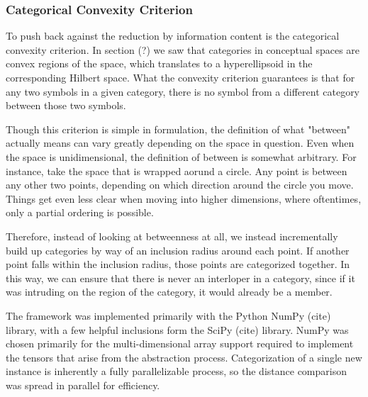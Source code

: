 \subsubsection{Categorical Convexity Criterion}
To push back against the reduction by information content is the categorical convexity criterion.  In section (?) we saw that categories in conceptual spaces are convex regions of the space, which translates to a hyperellipsoid in the corresponding Hilbert space.  What the convexity criterion guarantees is that for any two symbols in a given category, there is no symbol from a different category between those two symbols.

Though this criterion is simple in formulation, the definition of what "between" actually means can vary greatly depending on the space in question.  Even when the space is unidimensional, the definition of between is somewhat arbitrary.  For instance, take the space that is wrapped aorund a circle.  Any point is between any other two points, depending on which direction around the circle you move.  Things get even less clear when moving into higher dimensions, where oftentimes, only a partial ordering is possible.

Therefore, instead of looking at betweenness at all, we instead incrementally build up categories by way of an inclusion radius around each point.  If another point falls within the inclusion radius, those points are categorized together.  In this way, we can ensure that there is never an interloper in a category, since if it was intruding on the region of the category, it would already be a member.


The framework was implemented primarily with the Python NumPy (cite) library, with a few helpful inclusions form the SciPy (cite) library.  NumPy was chosen primarily for the multi-dimensional array support required to implement the tensors that arise from the abstraction process.  Categorization of a single new instance is inherently a fully parallelizable process, so the distance comparison was spread in parallel for efficiency.



